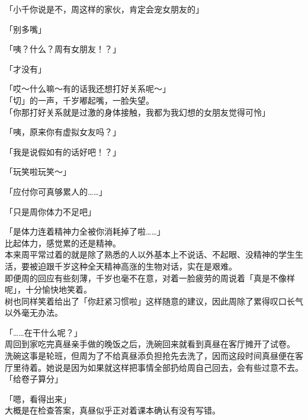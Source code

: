「小千你说是不，周这样的家伙，肯定会宠女朋友的」

「别多嘴」

「咦？什么？周有女朋友！？」

「才没有」

「哎～什么嘛～有的话我还想打好关系呢～」\\

「切」的一声，千岁嘟起嘴，一脸失望。\\

「你那打好关系就是过激的身体接触，我都为我幻想的女朋友觉得可怜」

「咦，原来你有虚拟女友吗？」

「我是说假如有的话好吧！？」

「玩笑啦玩笑～」

「应付你可真够累人的……」

「只是周你体力不足吧」

「是体力连着精神力全被你消耗掉了啦……」\\

比起体力，感觉累的还是精神。\\

本来周平常过着的就是除了熟悉的人以外基本上不说话、不起眼、没精神的学生生活，要被迫跟千岁这种全天精神高涨的生物对话，实在是艰难。\\

即便周的回应有些刻薄，千岁也毫不在意，对着一脸疲劳的周说着「真是不像样呢」，十分愉快地笑着。\\

树也同样笑着给出了「你赶紧习惯啦」这样随意的建议，因此周除了累得叹口长气以外毫无办法。\\

\vspace{2\baselineskip}

「……在干什么呢？」\\

周回到家吃完真昼亲手做的晚饭之后，洗碗回来就看到真昼在客厅摊开了试卷。\\

洗碗这事是轮班，但周为了不给真昼添负担抢先去洗了，因而这段时间真昼便在客厅里待着。她说是因为如果就这样把事情全部扔给周自己回去，会有些过意不去。\\

「给卷子算分」

「嗯，看得出来」\\

大概是在检查答案，真昼似乎正对着课本确认有没有写错。\\

